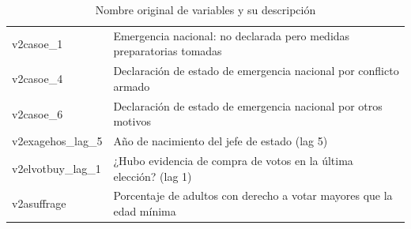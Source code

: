\documentclass{article}
\begin{document}
\begin{table}[H]
\begin{tabular}{ll}
    v2casoe\_1                 & Emergencia nacional: no declarada pero medidas preparatorias tomadas \\
    v2casoe\_4                 & Declaración de estado de emergencia nacional por conflicto armado \\
    v2casoe\_6                 & Declaración de estado de emergencia nacional por otros motivos \\
    v2exagehos\_lag\_5         & Año de nacimiento del jefe de estado (lag 5) \\
    v2elvotbuy\_lag\_1         & ¿Hubo evidencia de compra de votos en la última elección? (lag 1) \\
    v2asuffrage                & Porcentaje de adultos con derecho a votar mayores que la edad mínima \\
    \bottomrule 
    \end{tabular}
  \caption{Nombre original de variables y su descripción \label{tab:vars}}
\end{table}

\printbibliography
\end{document}
